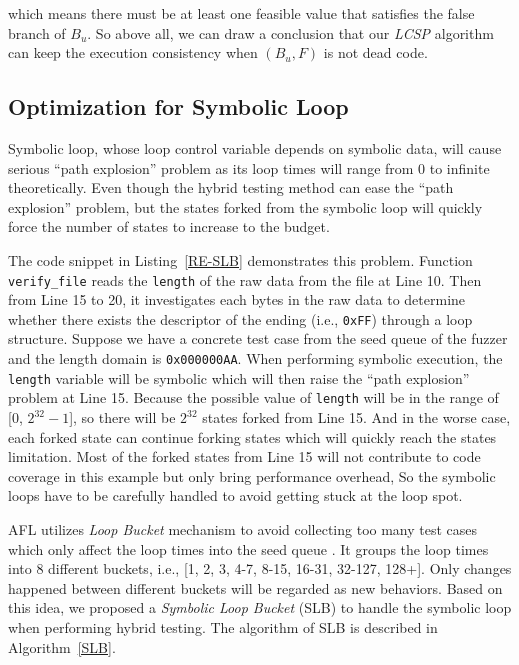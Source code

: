 \noindent which means there must be at least one feasible value that satisfies the false branch of $B_u$. So above all, we can draw a conclusion that our \emph{LCSP} algorithm can keep the execution consistency when $(B_u, F)$ is not dead code.

\subsection{Optimization for Symbolic Loop}
Symbolic loop, whose loop control variable depends on symbolic data, will cause serious ``path explosion'' problem as its loop times will range from 0 to infinite theoretically. 
Even though the hybrid testing method can ease the ``path explosion'' problem, but the states forked from the symbolic loop will quickly force the number of states to increase to the budget. 

 

The code snippet in Listing~\ref{RE-SLB} demonstrates this problem. Function \texttt{verify\_file} reads the \texttt{length} of the raw data from the file at Line 10. Then from Line 15 to 20, it investigates each bytes in the raw data to determine whether there exists the descriptor of the ending (i.e., \texttt{0xFF}) through a loop structure. Suppose we have a concrete test case from the seed queue of the fuzzer and the length domain is \texttt{0x000000AA}. 
When performing symbolic execution, the \texttt{length} variable will be symbolic which will then raise the ``path explosion'' problem at Line 15. Because the possible value of \texttt{length} will be in the range of [0, $2^{32}-1$], so there will be $2^{32}$ states forked from Line 15. And in the worse case, each forked state can continue forking states which will quickly reach the states limitation. 
Most of the forked states from Line 15 will not contribute to code coverage in this example but only bring performance overhead, So the symbolic loops have to be carefully handled to avoid getting stuck at the loop spot. 

AFL utilizes \emph{Loop Bucket} mechanism to avoid collecting too many test cases which only affect the loop times into the seed queue \cite{online:afl}. It groups the loop times into 8 different buckets, i.e., [1, 2, 3, 4-7, 8-15, 16-31, 32-127, 128+]. Only changes happened between different buckets will be regarded as new behaviors. Based on this idea, we proposed a \textit{Symbolic Loop Bucket} (SLB) to handle the symbolic loop when performing hybrid testing. The algorithm of SLB is described in Algorithm~\ref{SLB}.

